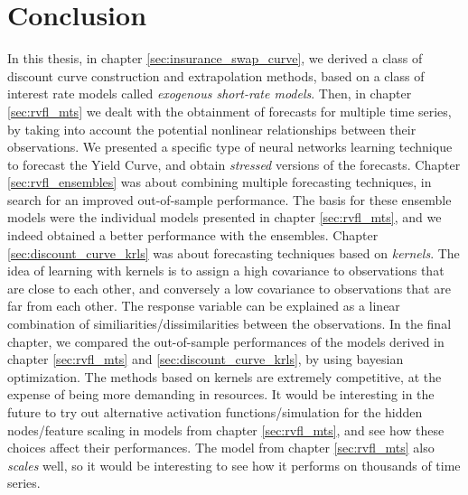 %
\chapter{Conclusion}
\label{sec:conclusion}

In this thesis, in chapter \ref{sec:insurance_swap_curve}, we derived a class of discount curve construction and extrapolation methods,  based on a class of interest rate models called \textit{exogenous short-rate models}. Then, in chapter \ref{sec:rvfl_mts} we dealt with the obtainment of forecasts for multiple time series, by taking into account the potential nonlinear relationships between their observations. We presented a specific type of neural networks learning technique to forecast the Yield Curve, and obtain \textit{stressed} versions of the forecasts. Chapter \ref{sec:rvfl_ensembles} was about combining multiple forecasting techniques, in search for an improved out-of-sample performance. The basis for these ensemble models were the individual models presented in chapter \ref{sec:rvfl_mts}, and we indeed obtained a better performance with the ensembles. Chapter \ref{sec:discount_curve_krls} was about forecasting techniques based on \textit{kernels}. The idea of learning with kernels is to assign a high covariance to observations that are close to each other, and conversely a low covariance to observations that are far from each other. The response variable can be explained as a linear combination of similiarities/dissimilarities between the observations. In the final chapter, we compared the out-of-sample performances of the models derived in chapter \ref{sec:rvfl_mts} and  \ref{sec:discount_curve_krls}, by using bayesian optimization. The methods based on kernels are extremely competitive, at the expense of being more demanding in resources. It would be interesting in the future to try out alternative activation functions/simulation for the hidden nodes/feature scaling in models from chapter \ref{sec:rvfl_mts}, and see how these choices affect their performances. The model from chapter \ref{sec:rvfl_mts} also \textit{scales} well, so it would be interesting to see how it performs on thousands of time series. 
